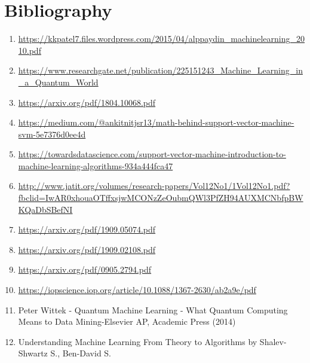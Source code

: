 \documentclass[hidelinks,12pt]{article}
\begin{document}
\section{Bibliography}
\begin{enumerate}
    \item \url{https://kkpatel7.files.wordpress.com/2015/04/alppaydin_machinelearning_2010.pdf}
    \item \url{https://www.researchgate.net/publication/225151243_Machine_Learning_in_a_Quantum_World}
    \item \url{https://arxiv.org/pdf/1804.10068.pdf}
    \item \url{https://medium.com/@ankitnitjsr13/math-behind-support-vector-machine-svm-5e7376d0ee4d}
    \item \url{https://towardsdatascience.com/support-vector-machine-introduction-to-machine-learning-algorithms-934a444fca47}
    \item \url{http://www.jatit.org/volumes/research-papers/Vol12No1/1Vol12No1.pdf?fbclid=IwAR0xhouaOTffxsjwMCONzZeOubmQWl3PfZH94AUXMCNbfpBWKQaDbSBefNI}
    \item \url{https://arxiv.org/pdf/1909.05074.pdf}
    \item \url{https://arxiv.org/pdf/1909.02108.pdf}
    \item \url{https://arxiv.org/pdf/0905.2794.pdf}
    \item \url{https://iopscience.iop.org/article/10.1088/1367-2630/ab2a9e/pdf}
    \item Peter Wittek - Quantum Machine Learning - What Quantum Computing Means to Data Mining-Elsevier AP, Academic Press (2014)
    \item Understanding Machine Learning From Theory to Algorithms by Shalev-Shwartz S., Ben-David S.
    \
\end{enumerate}
\end{document}
